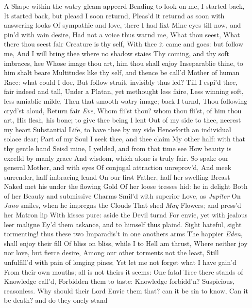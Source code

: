 \documentclass[11pt]{book}
\newcounter {first}
\begin{document}
A Shape within the watry gleam appeerd 
Bending to look on me, I started back, 
It started back, but pleasd I soon returnd, 
Pleas'd it returnd as soon with answering looks 
Of sympathie and love, there I had fixt 
Mine eyes till now, and pin'd with vain desire, 
Had not a voice thus warnd me, What thou seest, 
What there thou seest fair Creature is thy self, 
With thee it came and goes: but follow me, 
And I will bring thee where no shadow staies 
Thy coming, and thy soft imbraces, hee 
Whose image thou art, him thou shall enjoy 
Inseparablie thine, to him shalt beare 
Multitudes like thy self, and thence be call'd 
Mother of human Race: what could I doe, 
But follow strait, invisibly thus led? 
Till I espi'd thee, fair indeed and tall, 
Under a Platan, yet methought less faire, 
Less winning soft, less amiablie milde, 
Then that smooth watry image; back I turnd, 
Thou following cryd'st aloud, Return fair \textit{Eve}, 
Whom fli'st thou? whom thou fli'st, of him thou art, 
His flesh, his bone; to give thee being I lent 
Out of my side to thee, neerest my heart 
Substantial Life, to have thee by my side 
Henceforth an individual solace dear; 
Part of my Soul I seek thee, and thee claim 
My other half: with that thy gentle hand 
Seisd mine, I yeilded, and from that time see 
How beauty is excelld by manly grace 
And wisdom, which alone is truly fair. 
\quad So spake our general Mother, and with eyes 
Of conjugal attraction unreprov'd, 
And meek surrender, half imbracing leand 
On our first Father, half her swelling Breast 
Naked met his under the flowing Gold 
Of her loose tresses hid: he in delight 
Both of her Beauty and submissive Charms 
Smil'd with superior Love, as \textit{Jupiter} 
On \textit{Juno} smiles, when he impregns the Clouds 
That shed \textit{May} Flowers; and press'd her Matron lip 
With kisses pure: aside the Devil turnd 
For envie, yet with jealous leer maligne 
Ey'd them askance, and to himself thus plaind. 
\quad Sight hateful, sight tormenting! thus these two 
Imparadis't in one anothers arms 
The happier \textit{Eden}, shall enjoy their fill 
Of bliss on bliss, while I to Hell am thrust, 
Where neither joy nor love, but fierce desire, 
Among our other torments not the least, 
Still unfulfill'd with pain of longing pines; 
Yet let me not forget what I have gain'd 
From their own mouths; all is not theirs it seems: 
One fatal Tree there stands of Knowledge call'd, 
Forbidden them to taste: Knowledge forbidd'n? 
Suspicious, reasonless.  Why should their Lord 
Envie them that? can it be sin to know, 
Can it be death? and do they onely stand 
\end{document}
